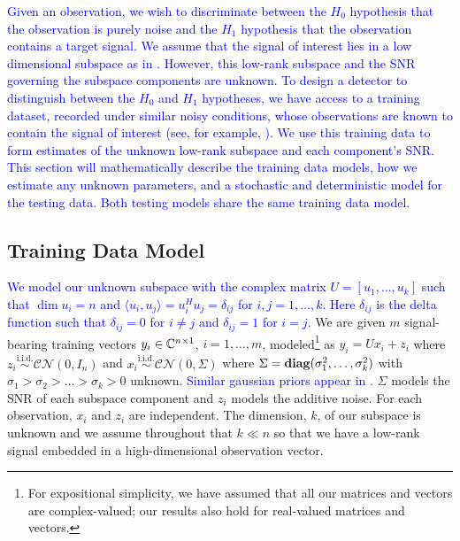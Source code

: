 \textcolor{blue}{Given an observation, we wish to discriminate between the $H_0$ hypothesis that the observation is purely noise and the $H_1$ hypothesis that the observation contains a target signal. We assume that the signal of interest lies in a low dimensional subspace as in \cite{besson2006cfar,bandiera2007glrt,bandiera2007adaptive,maris2003resampling,soong1995principal,besson2005matched,thai2002invariant, healey1999models,kwon2006kernel}. However, this low-rank subspace and the SNR governing the subspace components are unknown. To design a detector to distinguish between the $H_0$ and $H_1$ hypotheses, we have access to a training dataset, recorded under similar noisy conditions, whose observations are known to contain the signal of interest (see, for example, \cite{healey1999models,kwon2006kernel}). We use this training data to form estimates of the unknown low-rank subspace and each component's SNR. This section will mathematically describe the training data models, how we estimate any unknown parameters, and a stochastic and deterministic model for the testing data. Both testing models share the same training data model.}

\subsection{Training Data Model}\label{sec:training_data}

\textcolor{blue}{We model our unknown subspace with the complex matrix $U=[u_1,\dots,u_k]$ such that $\dim u_i = n$ and $\langle u_i, u_j\rangle = u_i^Hu_j=\delta_{ij}$ for $i,j=1,\dots,k$. Here $\delta_{ij}$ is the delta function such that $\delta_{ij} = 0$ for $i\neq j$ and $\delta_{ij}=1$ for $i=j$.} We are given $m$ signal-bearing training vectors $y_i\in \mathbb{C}^{n\times 1}$, $i=1,\dots,m$, modeled\footnote{For expositional simplicity, we have assumed that all our matrices and vectors are complex-valued; our results also hold for real-valued matrices and vectors.} as $y_i=Ux_i+z_i$ where $z_i\overset{\text{i.i.d.}}{\sim}\mathcal{CN}(0,I_n)$ and $x_i\overset{\text{i.i.d.}}{\sim}\mathcal{CN}(0,\Sigma)$ where $\Sigma=\mathop{\bf diag}(\sigma_1^2,\dots,\sigma_k^2)$ with $\sigma_1>\sigma_2>\dots>\sigma_k>0$ unknown. \textcolor{blue}{Similar gaussian priors appear in \cite{bandiera2007glrt, bandiera2007adaptive,thai2002invariant, healey1999models}}. $\Sigma$ models the SNR of each subspace component and $z_i$ models the additive noise. For each observation, $x_i$ and $z_i$ are independent. The dimension, $k$, of our subspace is unknown and we assume throughout that $k\ll n$ so that we have a low-rank signal embedded in a high-dimensional observation vector.

